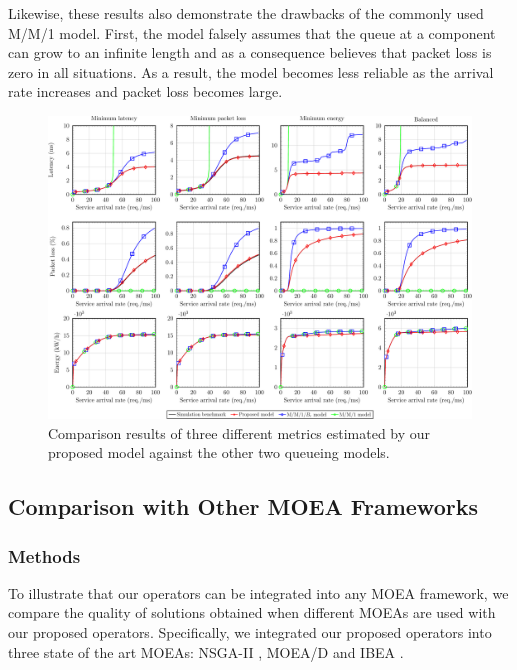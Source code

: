 Likewise, these results also demonstrate the drawbacks of the commonly used M/M/1 model. First, the model falsely assumes that the queue at a component can grow to an infinite length and as a consequence believes that packet loss is zero in all situations. As a result, the model becomes less reliable as the arrival rate increases and packet loss becomes large.

\vspace{0.5em}
\noindent
{}

\begin{figure}[t!]
    \centering
    \includegraphics[width=\textwidth]{graphs/general/model_sim-crop}
    \caption{Comparison results of three different metrics estimated by our proposed model against the other two queueing models.}
    \label{fig:model_sim}
\end{figure}

\subsection{Comparison with Other MOEA Frameworks}
\label{sec:moea_comparison}

\subsubsection{Methods}
To illustrate that our operators can be integrated into any MOEA framework, we compare the quality of solutions obtained when different MOEAs are used with our proposed operators. Specifically, we integrated our proposed operators into three state of the art MOEAs: NSGA-II \cite{DebAPM02}, MOEA/D \cite{ZhangL07} and IBEA \cite{ZitzlerK04}.

